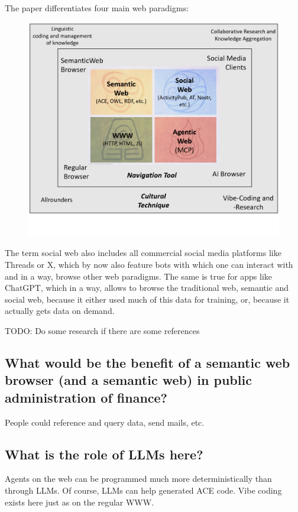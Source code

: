 \documentclass[12pt,a4paper]{article}
\begin{document}
The paper differentiates four main web paradigms:

\begin{figure}[h]
    \includegraphics[width=16cm]{different_web_paradigm}
\end{figure}

The term social web also includes all commercial social media platforms like Threads or X, which by now also feature bots with which one can interact with and in a way, browse other web paradigms.
The same is true for apps like ChatGPT, which in a way, allows to browse the traditional web, semantic and social web, because it either used much of this data for training, or, because it actually gets data on demand.

TODO: Do some research if there are some references

\subsection{What would be the benefit of a semantic web browser (and a semantic web) in public administration of finance?}

People could reference and query data, send mails, etc.

\subsection{What is the role of LLMs here?}

Agents on the web can be programmed much more deterministically than through LLMs. Of course, LLMs can help generated ACE code. Vibe coding exists here just as on the regular WWW.
\end{document}
